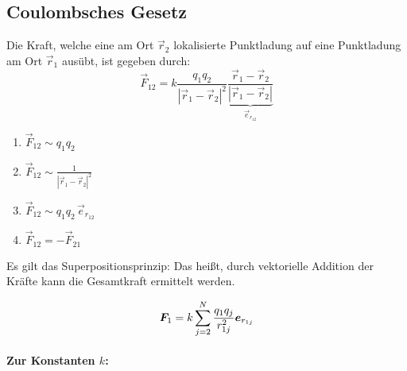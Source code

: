 \subsection{Coulombsches Gesetz}

\begin{minipage}{.585\linewidth}
	Die Kraft, welche eine am Ort $\vec{r}_2$ lokalisierte Punktladung auf eine Punktladung am Ort $\vec{r}_1$ ausübt, ist gegeben durch:
	$$\vec{F}_{12} = k \frac{q_1 q_2}{|\vec{r}_1 - \vec{r}_2|^2} \underbrace{\frac{\vec{r}_1 - \vec{r}_2}{|\vec{r}_1 - \vec{r}_2|}}_{\vec{e}_{r_{12}}}$$
\end{minipage}
\begin{minipage}{.4\linewidth}
	\hspace{30pt}
\end{minipage}

\begin{enumerate}
	\item $\vec{F}_{12} \sim q_1 q_2$
	\item $\vec{F}_{12} \sim \frac{1}{|\vec{r}_1 - \vec{r}_2|^2}$
	\item $\vec{F}_{12} \sim q_1 q_2\, \vec{e}_{r_{12}}$
	\item $\vec{F}_{12} = -\vec{F}_{21}$
\end{enumerate}
Es gilt das Superpositionsprinzip: Das heißt, durch vektorielle Addition der Kräfte kann die Gesamtkraft ermittelt werden.

$$\bm{F}_1 = k \sum_{j = 2}^{N} \frac{q_1 q_j}{r_{1j}^2}\bm{e}_{r_{1j}}$$

\paragraph{Zur Konstanten $k$:}


